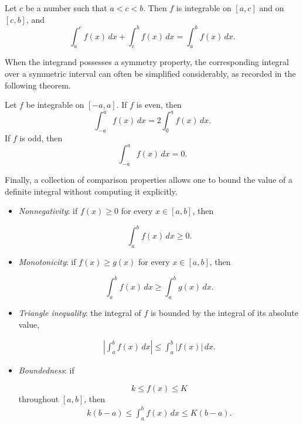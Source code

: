 \begin{theorem}
Let $c$ be a number such that $a < c < b$. Then $f$ is integrable on $[a,c]$ and on $[c,b]$, and
\[
\int_a^c f(x) \, dx + \int_c^b f(x) \, dx = \int_a^b f(x) \, dx.
\]

\end{theorem}

When the integrand possesses a symmetry property, the corresponding integral over a symmetric interval can often be simplified considerably, as recorded in the following theorem.

\begin{theorem}
Let $f$ be integrable on $[-a,a]$. If $f$ is even, then
\[
\int_{-a}^{a} f(x) \, dx = 2 \int_0^a f(x) \, dx.
\]
If $f$ is odd, then
\[
\int_{-a}^{a} f(x) \, dx = 0.
\]

\end{theorem}

Finally, a collection of comparison properties allows one to bound the value of a definite integral without computing it explicitly.

\begin{itemize}
\item \textit{Nonnegativity}: if $f(x) \geq 0$ for every $x \in [a,b]$, then

\[
\int_a^b f(x) \, dx \geq 0.
\]

\item \textit{Monotonicity}: if $f(x) \geq g(x)$ for every $x \in [a,b]$, then

\[
\int_a^b f(x) \, dx \geq \int_a^b g(x) \, dx.
\]

\item \textit{Triangle inequality}: the integral of $f$ is bounded by the integral of its absolute value,

\begin{align*}
\left| \int_a^b f(x) \, dx \right| \leq \int_a^b |f(x)| \, dx.
\end{align*}

\item \textit{Boundedness}: if

\[
k \leq f(x) \leq K
\]
throughout $[a,b]$, then
\begin{align*}
k(b-a) \leq \int_a^b f(x) \, dx \leq K(b-a).
\end{align*}

\end{itemize}




